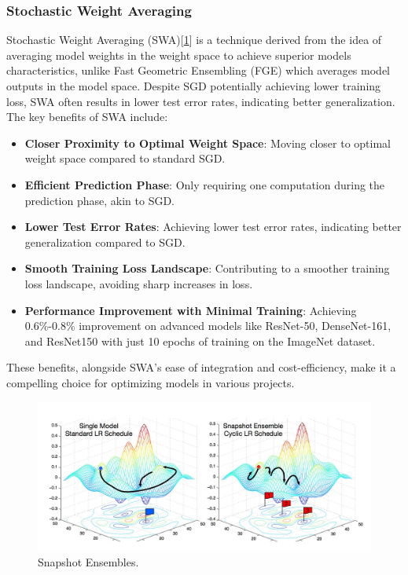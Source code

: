 \documentclass[10pt,twocolumn,letterpaper]{article}
\begin{document}
\subsubsection{Stochastic Weight Averaging}
Stochastic Weight Averaging (SWA)\cite{izmailov2018averaging, huang2017snapshot}[\ref{fig:swa-clr}] is a technique derived from the idea of averaging model weights in the weight space to achieve superior models characteristics, unlike Fast Geometric Ensembling (FGE)\cite{izmailov2018averaging} which averages model outputs in the model space. Despite SGD\cite{ruder2016overview} potentially achieving lower training loss, SWA often results in lower test error rates, indicating better generalization. The key benefits of SWA include\cite{izmailov2018averaging, ruder2016overview}:
\begin{itemize}
    \item \textbf{Closer Proximity to Optimal Weight Space}: Moving closer to optimal weight space compared to standard SGD.
    \item \textbf{Efficient Prediction Phase}: Only requiring one computation during the prediction phase, akin to SGD.
    \item \textbf{Lower Test Error Rates}: Achieving lower test error rates, indicating better generalization compared to SGD.
    \item \textbf{Smooth Training Loss Landscape}: Contributing to a smoother training loss landscape, avoiding sharp increases in loss.
    \item \textbf{Performance Improvement with Minimal Training}: Achieving 0.6\%-0.8\% improvement on advanced models like ResNet-50, DenseNet-161, and ResNet150 with just 10 epochs of training on the ImageNet dataset.
\end{itemize}
These benefits, alongside SWA's ease of integration and cost-efficiency, make it a compelling choice for optimizing models in various projects.


\begin{figure}[h]
	\centering
	\includegraphics[width=\columnwidth]{swa-clr}
	\caption{Snapshot Ensembles\cite{huang2017snapshot, izmailov2018averaging, smith2017cyclical}.}
	\label{fig:swa-clr}
\end{figure}
\end{document}
